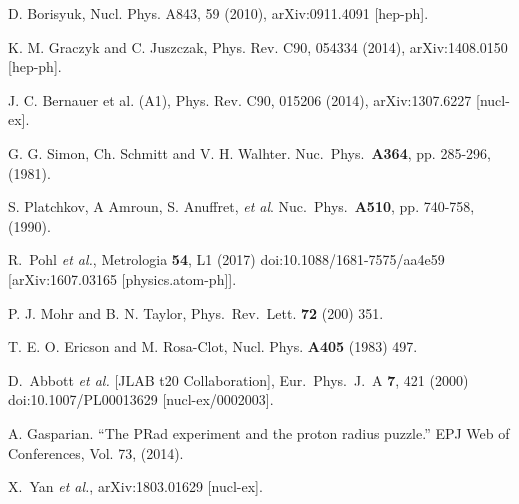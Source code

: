 \documentclass[aps,prd,twocolumn,groupedaddress,10pt]{revtex4-1}
\begin{document}
\begin{thebibliography}{99}
	  D. Borisyuk, Nucl. Phys. A843, 59 (2010), arXiv:0911.4091 [hep-ph].
	  
	  K. M. Graczyk and C. Juszczak, Phys. Rev. C90, 054334 (2014), arXiv:1408.0150 [hep-ph].
	  
	  J. C. Bernauer et al. (A1), Phys. Rev. C90, 015206 (2014), arXiv:1307.6227 [nucl-ex].
	 
  G. G. Simon, Ch. Schmitt and V. H. Walhter. Nuc.\ Phys.\ {\bf A364}, pp. 285-296, (1981).
  
  S. Platchkov, A Amroun, S. Anuffret, \emph{et al}. Nuc.\ Phys.\ {\bf A510}, pp. 740-758, (1990).


	
	R.~Pohl {\it et al.},
	Metrologia {\bf 54}, L1 (2017)
	doi:10.1088/1681-7575/aa4e59
	[arXiv:1607.03165 [physics.atom-ph]].

	 
	P. J. Mohr and B. N. Taylor, Phys.\ Rev.\ Lett. {\bf 72} (200) 351.
	
	T. E. O. Ericson and M. Rosa-Clot, Nucl. Phys. {\bf A405} (1983) 497.
	
  D.~Abbott {\it et al.} [JLAB t20 Collaboration],
  Eur.\ Phys.\ J.\ A {\bf 7}, 421 (2000)
  doi:10.1007/PL00013629
  [nucl-ex/0002003].
 
  
  
  A. Gasparian. ``The PRad experiment and the proton radius puzzle.'' EPJ Web of Conferences, Vol. 73, (2014).

  X.~Yan {\it et al.},
  arXiv:1803.01629 [nucl-ex].

\end{thebibliography}
\end{document}
